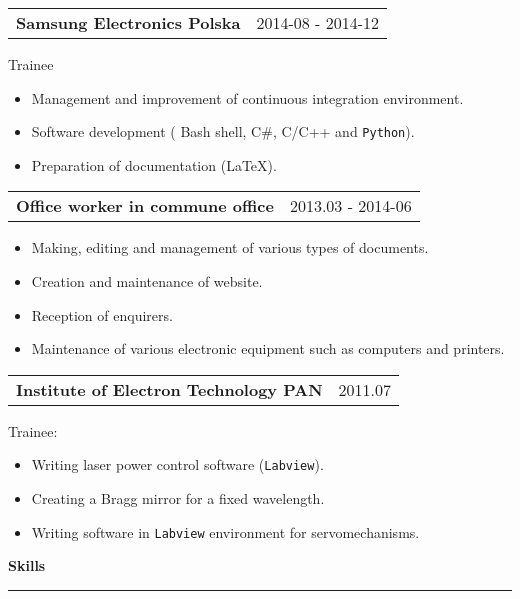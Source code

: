 \documentclass{article}
\begin{document}
\begin{tabular}{@{} m{} R{0.37\textwidth} }
	\textbf{Samsung Electronics Polska}	& {2014-08 - 2014-12} 
\end{tabular}
Trainee\\
\begin{itemize}
	\item Management and improvement of continuous integration environment.
	\item Software development ( Bash shell, C\#, C/C++ and \texttt{Python}).
	\item Preparation of documentation (\LaTeX). 
\end{itemize}

\begin{tabular}{@{} m{} R{0.37\textwidth} }
\textbf{Office worker in commune office} & {2013.03 - 2014-06} 
\end{tabular}
\begin{itemize}
	\item Making, editing and management of various types of documents.
	\item Creation and maintenance of website.
	\item Reception of enquirers.
	\item Maintenance of various electronic equipment such as computers and printers.
\end{itemize}

\begin{tabular}{@{} m{} R{0.37\textwidth} }
\textbf{Institute of Electron Technology PAN} & {2011.07} 
\end{tabular}
Trainee:
\begin{itemize}
	\item Writing laser power control software (\texttt{Labview}).
	\item Creating a Bragg mirror for a fixed wavelength.
	\item Writing software in \texttt{Labview} environment for servomechanisms.
\end{itemize}

\textbf{\large Skills}
\vspace{0.005\textheight}
\hrule 
\end{document}
